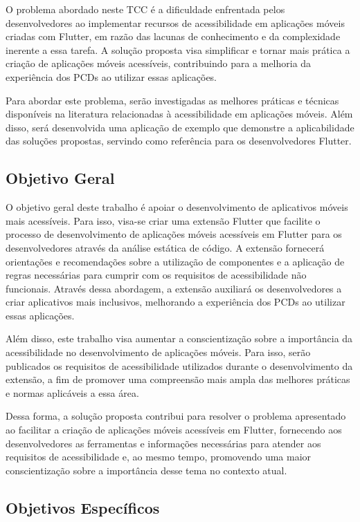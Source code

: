 O problema abordado neste TCC é a dificuldade enfrentada pelos desenvolvedores ao implementar recursos de acessibilidade em aplicações móveis criadas com Flutter, em razão das lacunas de conhecimento e da complexidade inerente a essa tarefa. A solução proposta visa simplificar e tornar mais prática a criação de aplicações móveis acessíveis, contribuindo para a melhoria da experiência dos PCDs ao utilizar essas aplicações.

Para abordar este problema, serão investigadas as melhores práticas e técnicas disponíveis na literatura relacionadas à acessibilidade em aplicações móveis. Além disso, será desenvolvida uma aplicação de exemplo que demonstre a aplicabilidade das soluções propostas, servindo como referência para os desenvolvedores Flutter.

\subsection{Objetivo Geral}

O objetivo geral deste trabalho é apoiar o desenvolvimento de aplicativos móveis mais acessíveis. Para isso, visa-se criar uma extensão Flutter que facilite o processo de desenvolvimento de aplicações móveis acessíveis em Flutter para os desenvolvedores através da análise estática de código. A extensão fornecerá orientações e recomendações sobre a utilização de componentes e a aplicação de regras necessárias para cumprir com os requisitos de acessibilidade não funcionais. Através dessa abordagem, a extensão auxiliará os desenvolvedores a criar aplicativos mais inclusivos, melhorando a experiência dos PCDs ao utilizar essas aplicações.

Além disso, este trabalho visa aumentar a conscientização sobre a importância da acessibilidade no desenvolvimento de aplicações móveis. Para isso, serão publicados os requisitos de acessibilidade utilizados durante o desenvolvimento da extensão, a fim de promover uma compreensão mais ampla das melhores práticas e normas aplicáveis a essa área.

Dessa forma, a solução proposta contribui para resolver o problema apresentado ao facilitar a criação de aplicações móveis acessíveis em Flutter, fornecendo aos desenvolvedores as ferramentas e informações necessárias para atender aos requisitos de acessibilidade e, ao mesmo tempo, promovendo uma maior conscientização sobre a importância desse tema no contexto atual.

\subsection{Objetivos Específicos}

